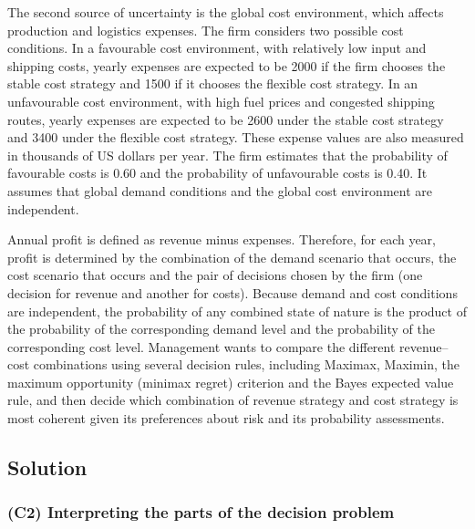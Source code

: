 \medskip
The second source of uncertainty is the global cost environment, which affects production and logistics expenses. The firm
considers two possible cost conditions. In a favourable cost environment, with relatively low input and shipping costs,
yearly expenses are expected to be 2000 if the firm chooses the stable cost strategy and 1500 if it chooses the flexible
cost strategy. In an unfavourable cost environment, with high fuel prices and congested shipping routes, yearly expenses
are expected to be 2600 under the stable cost strategy and 3400 under the flexible cost strategy. These expense values are
also measured in thousands of US dollars per year. The firm estimates that the probability of favourable costs is 0.60 and
the probability of unfavourable costs is 0.40. It assumes that global demand conditions and the global cost environment are
independent.

\medskip
Annual profit is defined as revenue minus expenses. Therefore, for each year, profit is determined by the combination of
the demand scenario that occurs, the cost scenario that occurs and the pair of decisions chosen by the firm (one decision
for revenue and another for costs). Because demand and cost conditions are independent, the probability of any combined
state of nature is the product of the probability of the corresponding demand level and the probability of the
corresponding cost level. Management wants to compare the different revenue--cost combinations using several decision
rules, including Maximax, Maximin, the maximum opportunity (minimax regret) criterion and the Bayes expected value rule,
and then decide which combination of revenue strategy and cost strategy is most coherent given its preferences about risk
and its probability assessments.

\subsection{Solution}\label{subsec:example3-solution}

\subsubsection{(C2) Interpreting the parts of the decision problem}\label{subsubsec:example3-c2}

